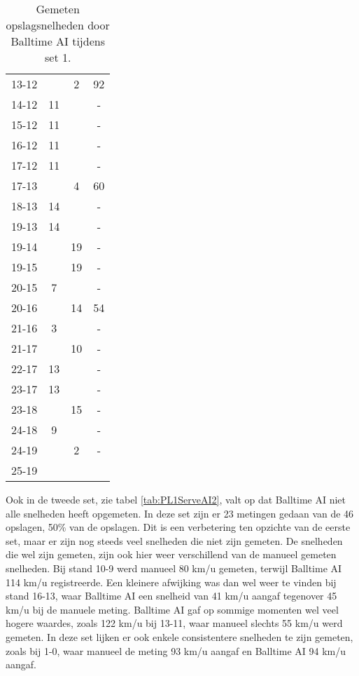 \begin{table}[ht!]
\begin{tabular}{|c|c|c|c|}
    13-12 & & 2 & 92 \\
    14-12 & 11 & & - \\
    15-12 & 11 & & - \\
    16-12 & 11 & & - \\
    17-12 & 11 & & - \\
    17-13 & & 4 & 60 \\
    18-13 & 14 & & - \\
    19-13 & 14 & & - \\
    19-14 & & 19 & - \\
    19-15 & & 19 & - \\
    20-15 & 7 & & - \\
    20-16 & & 14 & 54 \\
    21-16 & 3 & & - \\
    21-17 & & 10 & - \\
    22-17 & 13 & & - \\
    23-17 & 13 & & - \\
    23-18 & & 15 & - \\
    24-18 & 9 & & - \\
    24-19 & & 2 & - \\
    25-19 & & & \\ \hline
  \end{tabular}
  \caption[Gemeten opslagsnelheden door Balltime AI tijdens set 1]{\label{tab:PL1ServeAI1}Gemeten opslagsnelheden door Balltime AI tijdens set 1.}
\end{table}

Ook in de tweede set, zie tabel \ref{tab:PL1ServeAI2}, valt op dat Balltime AI niet alle snelheden heeft opgemeten. In deze set zijn er 23 metingen gedaan van de 46 opslagen, 50\% van de opslagen. Dit is een verbetering ten opzichte van de eerste set, maar er zijn nog steeds veel snelheden die niet zijn gemeten. De snelheden die wel zijn gemeten, zijn ook hier weer verschillend van de manueel gemeten snelheden. Bij stand 10-9 werd manueel 80 km/u gemeten, terwijl Balltime AI 114 km/u registreerde. Een kleinere afwijking was dan wel weer te vinden bij stand 16-13, waar Balltime AI een snelheid van 41 km/u aangaf tegenover 45 km/u bij de manuele meting. Balltime AI gaf op sommige momenten wel veel hogere waardes, zoals 122 km/u bij 13-11, waar manueel slechts 55 km/u werd gemeten. In deze set lijken er ook enkele consistentere snelheden te zijn gemeten, zoals bij 1-0, waar manueel de meting 93 km/u aangaf en Balltime AI 94 km/u aangaf.

